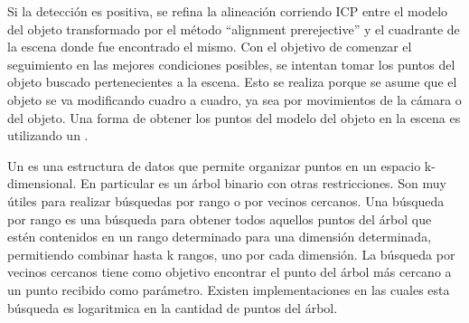 Si la detección es positiva, se refina la alineación corriendo ICP entre el modelo del objeto transformado por el método ``alignment prerejective'' y el cuadrante de la escena donde fue encontrado el mismo. Con el objetivo de comenzar el seguimiento en las mejores condiciones posibles, se intentan tomar los puntos del objeto buscado pertenecientes a la escena. Esto se realiza porque se asume que el objeto se va modificando cuadro a cuadro, ya sea por movimientos de la cámara o del objeto. Una forma de obtener los puntos del modelo del objeto en la escena es utilizando un \kdt.

Un \kdt es una estructura de datos que permite organizar puntos en un espacio k-dimensional. En particular es un árbol binario con otras restricciones. Son muy útiles para realizar búsquedas por rango o por vecinos cercanos. Una búsqueda por rango es una búsqueda para obtener todos aquellos puntos del árbol que estén contenidos en un rango determinado para una dimensión determinada, permitiendo combinar hasta k rangos, uno por cada dimensión. La búsqueda por vecinos cercanos tiene como objetivo encontrar el punto del árbol más cercano a un punto recibido como parámetro. Existen implementaciones en las cuales esta búsqueda es logaritmica en la cantidad de puntos del árbol.

